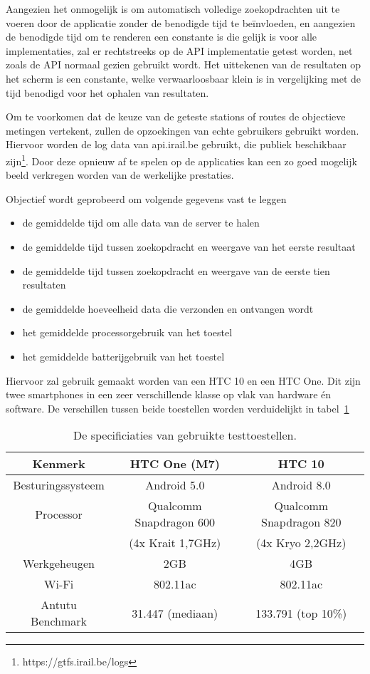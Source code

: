 Aangezien het onmogelijk is om automatisch volledige zoekopdrachten uit te voeren door de applicatie zonder de benodigde tijd te beïnvloeden, en aangezien de benodigde tijd om te renderen een constante is die gelijk is voor alle implementaties, zal er rechtstreeks op de API implementatie getest worden, net zoals de API normaal gezien gebruikt wordt. Het uittekenen van de resultaten op het scherm is een constante, welke verwaarloosbaar klein is in vergelijking met de tijd benodigd voor het ophalen van resultaten.

Om te voorkomen dat de keuze van de geteste stations of routes de objectieve metingen vertekent, zullen de opzoekingen van echte gebruikers gebruikt worden. Hiervoor worden de log data van api.irail.be gebruikt, die publiek beschikbaar zijn\footnote{https://gtfs.irail.be/logs}. Door deze  opnieuw af te spelen op de applicaties kan een zo goed mogelijk beeld verkregen worden van de werkelijke prestaties.

Objectief wordt geprobeerd om volgende gegevens vast te leggen
\begin{itemize}
	\item de gemiddelde tijd om alle data van de server te halen
	\item de gemiddelde tijd tussen zoekopdracht en weergave van het eerste resultaat
	\item de gemiddelde tijd tussen zoekopdracht en weergave van de eerste tien resultaten
	\item de gemiddelde hoeveelheid data die verzonden en ontvangen wordt
	\item het gemiddelde processorgebruik van het toestel
	\item het gemiddelde batterijgebruik van het toestel
\end{itemize}

Hiervoor zal gebruik gemaakt worden van een HTC 10 en een HTC One. Dit zijn twee smartphones in een zeer verschillende klasse op vlak van hardware én software. De verschillen tussen beide toestellen worden verduidelijkt in tabel~\ref{tab:testdevices}
\begin{table}[ht]
	\centering
	\begin{tabular}{| c | c | c |}
		\hline
		Kenmerk & HTC One (M7) & HTC 10 \\
		\hline
		Besturingssysteem & Android 5.0 & Android 8.0 \\
		Processor & Qualcomm Snapdragon 600 & Qualcomm Snapdragon 820\\
		& (4x Krait 1,7GHz) & (4x Kryo 2,2GHz) \\
		Werkgeheugen & 2GB & 4GB \\
		Wi-Fi & 802.11ac & 802.11ac \\
		\hline
		Antutu Benchmark & 31.447 (mediaan)  & 133.791 (top 10\%) \\
		\hline
	\end{tabular}
	\caption[Specificaties van de toestellen gebruikt voor testen]{De specificiaties van gebruikte testtoestellen.}
	\label{tab:testdevices}
\end{table}

